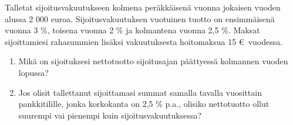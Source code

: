 \documentclass{article}\usepackage[]{graphicx}\usepackage[]{color}
\begin{document}
\begin{question} Talletat sijoitusvakuutukseen kolmena peräkkäisenä vuonna jokaisen vuoden alussa 2 000 euroa. Sijoitusvakuutuksen vuotuinen tuotto on ensimmäisenä vuonna 3 \%, toisena vuonna 2 \% ja kolmantena vuonna 2{,}5 \%. Maksat sijoittamiesi rahasummien lisäksi vakuutuksesta hoitomaksua 15 \euro \ vuodessa. 
\begin{enumerate}
  \item Mikä on sijoituksesi nettotuotto sijoitusajan päättyessä kolmannen vuoden lopussa? 
  \item Jos olisit tallettanut sijoittamasi summat samalla tavalla vuosittain pankkitilille, jonka korkokanta on 2{,}5 \% p.a., olisiko nettotuotto ollut suurempi vai pienempi kuin sijoitusvakuutuksessa?
\end{enumerate}
\end{question}

\begin{solution}\end{solution}
\end{document}
